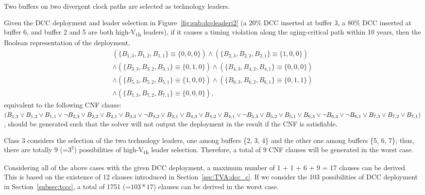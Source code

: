 \begin{class}
\label{class:c6}
Two buffers on two divergent clock paths are selected as technology leaders.

Given the DCC deployment and leader selection in Figure~\ref{fig:sub:dccleaderi2} (a 20\% DCC inserted at buffer 3, a 80\% DCC inserted at buffer 6, and buffer 2 and 5 are both  high-V\textsubscript{th} leaders), if it causes a timing violation along the aging-critical path within 10 years, then the Boolean representation of the deployment, 
{\fontsize{8}{8.4}
\begin{gather*}
\left(\{B_{1,3}, B_{1,2}, B_{1,1}\} \equiv \{0, 0, 0\} \right) \land \left( \{B_{2,3}, B_{2,2}, B_{2,1}\} \equiv \{1, 0, 0\} \right) \\ 
\land \left( \{B_{3,3}, B_{3,2}, B_{3,1}\} \equiv \{0, 1, 0\} \right) \land \left( \{B_{4,3}, B_{4,2}, B_{4,1}\} \equiv \{0, 0, 0\} \right) \\ 
\land \left( \{B_{5,3}, B_{5,2}, B_{5,1}\} \equiv \{1, 0, 0\} \right) \land \left( \{B_{6,3}, B_{6,2}, B_{6,1}\} \equiv \{0, 1, 1\} \right) \\ 
\land \left( \{B_{7,3}, B_{7,2}, B_{7,1}\} \equiv \{0, 0, 0\} \right),
\end{gather*}
}
equivalent to the following  CNF clause: 
{\fontsize{8}{8.4}$(B_{1,3} \lor B_{1,2} \lor B_{1,1} \lor \neg B_{2,3} \lor B_{2,2} \lor B_{2,1} \lor B_{3,3} \lor \neg B_{3,2} \lor B_{3,1} \lor B_{4,3} \lor B_{4,2} \lor B_{4,1} \lor \neg B_{5,3} \\
\lor B_{5,2} \lor B_{5,1} \lor B_{6,3} \lor \neg B_{6,2} \lor  \neg B_{6,1} \lor B_{7,3} \lor B_{7,2} \lor B_{7,1} )$}, should be generated such that the solver will not output the deployment in the result if the CNF is satisfiable.

Class 3 considers the selection of the two technology leaders, one among buffers \{2, 3, 4\} and the other one among buffers \{5, 6, 7\}; thus, there are totally 9 (=$3^2$) possibilities of high-V\textsubscript{th} leader selection. Therefore, a total of 9 CNF clauses will be generated in the worst case.

Considering all of the above cases with the given DCC deployment, a maximum number of 1 + 1 + 6 + 9 = 17 clauses can be derived. This is based on the existence of 12 clauses introduced in Section~\ref{sec:TVA:dcc_c}. If we consider the 103 possibilities of DCC deployment in Section~\ref{subsec:tccc}, a total of 1751 (=$103*17$) clauses can be derived in the worst case.

\end{class}

